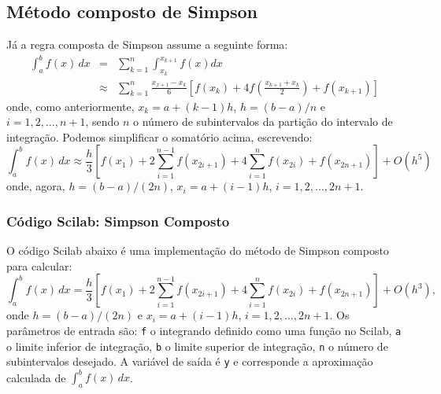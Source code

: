 \subsection{Método composto de Simpson}
Já a regra composta de Simpson assume a seguinte forma:
\begin{eqnarray*}
  \int_{a}^b f(x)\,dx &=& \sum_{k=1}^{n} \int_{x_k}^{x_{k+1}} f(x)dx \\
  &\approx& \sum_{k=1}^{n} \frac{x_{x+1}-x_k}{6}\left[f(x_k) + 4f\left(\frac{x_{k+1}+x_k}{2}\right)+f(x_{k+1})\right]
\end{eqnarray*}
onde, como anteriormente, $x_k = a + (k-1)h$, $h = (b-a)/n$ e $i = 1,2,\dotsc,n+1$, sendo $n$ o número de subintervalos da partição do intervalo de integração. Podemos simplificar o somatório acima, escrevendo:
\begin{equation*}
  \int_{a}^b f(x)\,dx \approx \frac{h}{3}\left[f(x_1) + 2\sum_{i=1}^{n-1} f(x_{2i+1}) + 4\sum_{i=1}^{n} f(x_{2i}) + f(x_{2n+1})\right] + O(h^5)
\end{equation*}
onde, agora, $h = (b-a)/(2n)$, $x_i = a + (i-1)h$, $i=1,2,\dotsc,2n+1$.

\ifisscilab
\subsubsection{Código Scilab: Simpson Composto}
O código Scilab abaixo é uma implementação do método de Simpson composto para calcular:
\begin{equation*}
  \int_a^b f(x)\,dx = \frac{h}{3}\left[f(x_1) + 2\sum_{i=1}^{n-1} f(x_{2i+1}) + 4\sum_{i=1}^{n} f(x_{2i}) + f(x_{2n+1})\right] + O(h^3),
\end{equation*}
onde $h = (b-a)/(2n)$ e $x_i = a + (i-1)h$, $i=1,2,\dotsc,2n+1$. Os parâmetros de entrada são: \verb+f+ o integrando definido como uma função no Scilab, \verb+a+ o limite inferior de integração, \verb+b+ o limite superior de integração, \verb+n+ o número de subintervalos desejado. A variável de saída é \verb+y+ e corresponde a aproximação calculada de $\int_a^b f(x)\, dx$.

\fi

